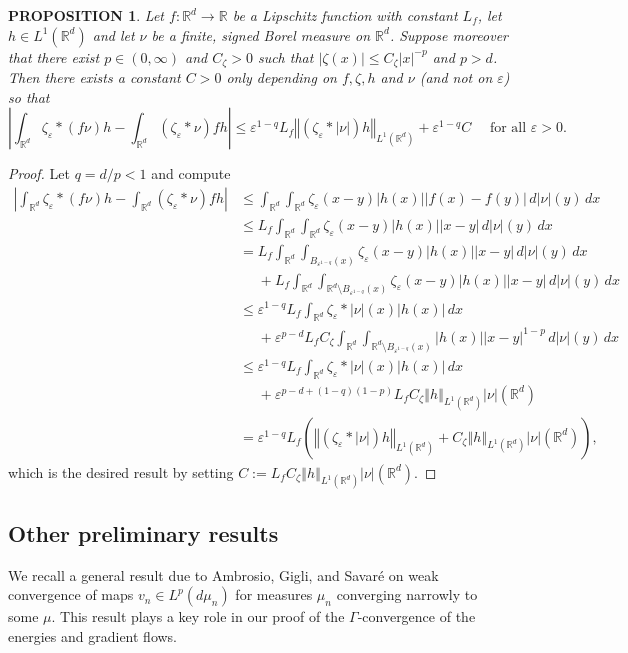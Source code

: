 \documentclass[11pt,leqno]{amsart}
\newtheorem{prop}[thm]{PROPOSITION}
\theoremstyle{definition}
\newcommand{\norm}[1]{\left\Vert#1\right\Vert}
\newcommand{\R}{{\mathord{\mathbb R}}}
\def\e{\varepsilon}
\newcommand{\ird}{\int_{\mathord{\mathbb R}^d}}
\begin{document}
\begin{prop} \label{move mollifier prop}
Let $f\colon \R^d \to \R$ be a Lipschitz function with constant $L_f$, let $h\in L^1(\R^d)$ and let $\nu$ be a finite, signed Borel measure on $\R^d$. Suppose moreover that there exist $p\in(0,\infty)$ and $C_\zeta>0$ such that $|\zeta(x)| \leq C_\zeta|x|^{-p}$ and $p>d$. Then there exists a constant $C >0$ only depending on $f,\zeta,h$ and $\nu$ (and not on $\e$) so that
\[ 
	\left| \ird \zeta_\e *(f\nu)h - \ird (\zeta_\e *\nu)fh \right|  \leq   \e^{1-q} L_f \norm{(\zeta_\e*|\nu|)h}_{L^1(\R^d)} + \e^{1-q} C \quad \text{ for all } \e >0.
\]
\end{prop}

\begin{proof}
	Let $q = d/p < 1$ and compute
\begin{align*}
	\left| \ird \zeta_\e *(f\nu)h - \ird (\zeta_\e *\nu)fh \right| &\leq \ird \ird \zeta_\e(x-y) |h(x)| |f(x)-f(y)| \,d|\nu|(y) \,dx\\
	&\leq L_f  \ird \ird \zeta_\e(x-y) |h(x)| |x-y| \,d|\nu|(y) \,dx\\
	&= L_f  \ird \int_{B_{\e^{1-q}}(x)} \zeta_\e(x-y) |h(x)| |x-y| \,d|\nu|(y) \,dx\\
	&\phantom{{}={}}+ L_f  \ird \int_{\R^d \setminus B_{\e^{1-q}}(x)} \zeta_\e(x-y) |h(x)| |x-y| \,d|\nu|(y) \,dx\\
	&\leq \e^{1-q} L_f \ird \zeta_\e*|\nu|(x) |h(x)| \,dx\\
	&\phantom{{}={}}+ \e^{p-d} L_f C_\zeta \ird \int_{\R^d \setminus B_{\e^{1-q}}(x)} |h(x)| |x-y|^{1-p} \,d|\nu|(y) \,dx\\ 
	&\leq \e^{1-q} L_f \ird \zeta_\e*|\nu|(x) |h(x)| \,dx\\
	&\phantom{{}={}}+ \e^{p-d + (1-q)(1-p)} L_f C_\zeta \norm{h}_{L^1(\R^d)} |\nu|(\R^d)\\
	&= \e^{1-q} L_f \left( \norm{(\zeta_\e*|\nu|)h}_{L^1(\R^d)} + C_\zeta \norm{h}_{L^1(\R^d)} |\nu|(\R^d) \right),
\end{align*}
which is the desired result by setting $C:= L_f C_\zeta \norm{h}_{L^1(\R^d)} |\nu|(\R^d)$.
\end{proof}


\subsection{Other preliminary results}

We recall a general result due to Ambrosio, Gigli, and Savar\'e on weak convergence of maps $v_n \in L^p(d\mu_n)$ for measures $\mu_n$ converging narrowly to some $\mu$. This result plays a key role in our proof of the $\Gamma$-convergence of the energies and gradient flows.
\end{document}
